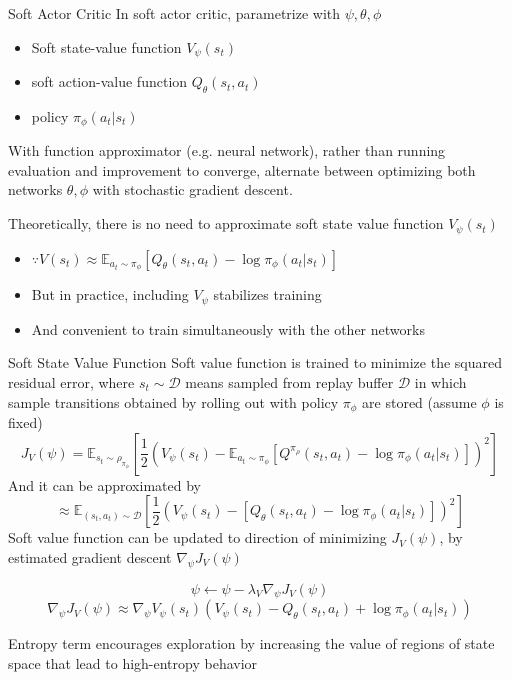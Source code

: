 \documentclass[8pt]{beamer}
\begin{document}
\begin{frame}{Soft Actor Critic}
    In soft actor critic, parametrize with $\psi, \theta, \phi$
    \begin{itemize}
        \item Soft state-value function $V_{\psi}(s_t)$
        \item soft action-value function $Q_{\theta}(s_t,a_t)$
        \item policy $\pi_\phi(a_t|s_t)$
    \end{itemize}
    
    \bigskip
    With function approximator (e.g. neural network), rather than running evaluation and improvement to converge, alternate between optimizing both networks \(\theta, \phi \) with stochastic gradient descent.

    \bigskip
    Theoretically, there is no need to approximate soft state value function $V_\psi(s_t)$
    \begin{itemize}
        \item $\because V(s_t) \approx \mathbb{E}_{a_t \sim \pi_{\phi}} [Q_\theta (s_t, a_t) - \log{\pi_\phi(a_t|s_t)}]$
        \item But in practice, including $V_\psi$ stabilizes training
        \item And convenient to train simultaneously with the other networks
    \end{itemize}
\end{frame}

\begin{frame}{Soft State Value Function}
    Soft value function is trained to minimize the squared residual error, where $s_t \sim \mathcal{D}$ means sampled from replay buffer $\mathcal{D}$ in which sample transitions obtained by rolling out with policy $\pi_{\phi}$ are stored (assume $\phi$ is fixed)
    \[
            J_V(\psi) = \mathbb{E}_{s_t \sim \rho_{\pi_\phi}}\left[\frac{1}{2}(V_\psi(s_t) - \mathbb{E}_{a_t \sim \pi_\phi}[Q^{\pi_\rho} (s_t, a_t) - \log{\pi_\phi}(a_t|s_t)])^2\right]
    \]
    And it can be approximated by
    \[
        \approx \mathbb{E}_{(s_t, a_t) \sim \mathcal{D}}\left[\frac{1}{2}(V_\psi(s_t)-[Q_\theta(s_t, a_t) - \log{\pi_\phi(a_t|s_t)}])^2\right]
    \]
    Soft value function can be updated to direction of minimizing $J_V(\psi)$, by estimated gradient descent $\nabla_\psi J_V(\psi)$
        
    \[
        \psi \leftarrow \psi - \lambda_V \nabla_{\psi} J_V(\psi)
    \]
    \[
        \nabla_{\psi} J_V(\psi) \approx \nabla_{\psi} V_{\psi}(s_t) (V_{\psi}(s_t) - Q_\theta (s_t, a_t) + \log{\pi_\phi(a_t|s_t)})
    \]

    Entropy term encourages exploration by increasing the value of regions of state space that lead to high-entropy behavior
\end{frame}
\end{document}
